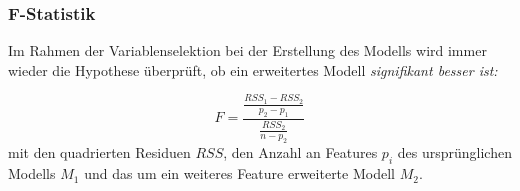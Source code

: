\subsubsection{F-Statistik}
Im Rahmen der Variablenselektion bei der Erstellung des Modells wird immer wieder die Hypothese überprüft, ob ein erweitertes Modell \it{signifikant} besser ist:

\begin{equation}
	F=\frac{\frac{RSS_1-RSS_2}{p_2-p_1}}{\frac{RSS_2}{n-p_2}}
\end{equation}
mit den quadrierten Residuen $RSS$, den Anzahl an Features $p_i$ des ursprünglichen Modells $M_1$ und das um ein weiteres Feature erweiterte Modell $M_2$.
